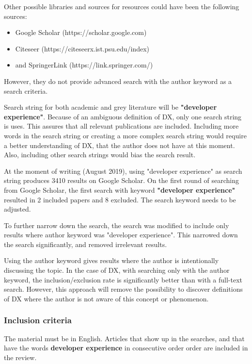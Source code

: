 \documentclass[english, 12pt, a4paper, sci, utf8, a-1b, online]{aaltothesis}
\begin{document}
Other possible libraries and sources for resources could have been the following sources:
\begin{itemize}
  \item Google Scholar (https://scholar.google.com)
  \item Citeseer (https://citeseerx.ist.psu.edu/index)
  \item and SpringerLink (https://link.springer.com/)
\end{itemize}

However, they do not provide advanced search with the author keyword as a search criteria.

Search string for both academic and grey literature will be \textbf{"developer experience"}. Because of an ambiguous definition of DX, only one search string is uses. This assures that all relevant publications are included. Including more words in the search string or creating a more complex search string would require a better understanding of DX, that the author does not have at this moment. Also, including other search strings would bias the search result.

At the moment of writing (August 2019), using "developer experience" as search string produces 3410 results on Google Scholar. On the first round of searching from Google Scholar, the first search with keyword \textbf{"developer experience"} resulted in 2 included papers and 8 excluded. The search keyword needs to be adjusted.

To further narrow down the search, the search was modified to include only results where author keyword was "developer experience". This narrowed down the search significantly, and removed irrelevant results.

Using the author keyword gives results where the author is intentionally discussing the topic. In the case of DX, with searching only with the author keyword, the inclusion/exclusion rate is significantly better than with a full-text search. However, this approach will remove the possibility to discover definitions of DX where the author is not aware of this concept or phenomenon.

\subsubsection{Inclusion criteria}

The material must be in English. Articles that show up in the searches, and that have the words \textbf{developer experience} in consecutive order order are included in the review.
\end{document}
